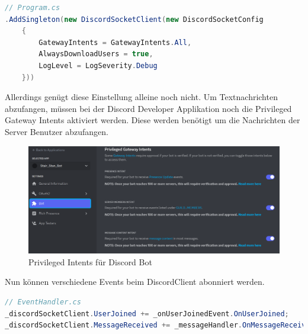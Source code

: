 \documentclass[a4paper, table]{article}
\begin{document}
\begin{lstlisting}[language=csharp]
// Program.cs
.AddSingleton(new DiscordSocketClient(new DiscordSocketConfig
    {
        GatewayIntents = GatewayIntents.All,
        AlwaysDownloadUsers = true,
        LogLevel = LogSeverity.Debug
    }))
\end{lstlisting}

Allerdings genügt diese Einstellung alleine noch nicht.
Um Textnachrichten abzufangen, müssen bei der Discord Developer Applikation noch die Privileged Gateway Intents aktiviert werden.
Diese werden benötigt um die Nachrichten der Server Benutzer abzufangen.

\begin{figure}[h]
    \centering
    \includegraphics[width=1\textwidth]{img/discord_developer_privileged_intents.png}
    \caption{Privileged Intents für Discord Bot}
    \label{fig:delevoper-privileged-intents}
\end{figure}

Nun können verschiedene Events beim DiscordClient abonniert werden.

\begin{lstlisting}[language=csharp]
// EventHandler.cs
_discordSocketClient.UserJoined += _onUserJoinedEvent.OnUserJoined;
_discordSocketClient.MessageReceived += _messageHandler.OnMessageReceived;
\end{lstlisting}
\end{document}
